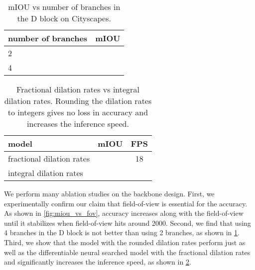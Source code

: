\documentclass[10pt,twocolumn,letterpaper]{article}
\begin{document}
\begin{table}
  \centering
  \caption{mIOU vs backbone on Cityscapes. We fix the decoder while ablating the backbone. When using a backbone with a small field-of-view such as RegNetY-600MF, adding a context module such as PPM or ASPP increases performance. However, incorporating dilated convolution into the backbone is much more effective than adding a context module, as shown by the superiority of RegSeg. }
  \label{tab:miou_vs_backbone}
\end{table}

\begin{table}
  \centering
  \begin{tabular}{l|c}
    \toprule
    number of branches & mIOU \\
    \midrule
2 & \\
    4 & \\
    \bottomrule
  \end{tabular}
  \caption{mIOU vs number of branches in the D block on Cityscapes.}
\label{tab:miou_vs_number_of_branches}
\end{table}

\begin{table}
  \centering
  \begin{tabular}{l|c|c}
    \toprule
    model & mIOU & FPS\\
    \midrule
    fractional dilation rates &  & 18\\
    integral dilation rates & & \\
    \bottomrule
  \end{tabular}
  \caption{Fractional dilation rates vs integral dilation rates. Rounding the dilation rates to integers gives no loss in accuracy and increases the inference speed.}
  \label{tab:fractional_vs_integral}
\end{table}
We perform many ablation studies on the backbone design. First, we experimentally confirm our claim that field-of-view is essential for the accuracy. As shown in \cref{fig:miou_vs_fov}, accuracy increases along with the field-of-view until it stabilizes when field-of-view hits around 2000. Second, we find that using 4 branches in the D block is not better than using 2 branches, as shown in \cref{tab:miou_vs_number_of_branches}. Third, we show that the model with the rounded dilation rates perform just as well as the differentiable neural searched model with the fractional dilation rates and significantly increases the inference speed, as shown in \cref{tab:fractional_vs_integral}.
\end{document}
